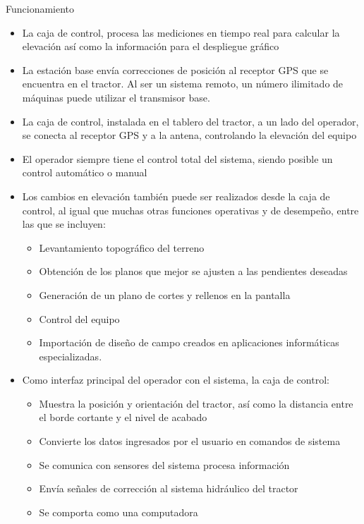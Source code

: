 Funcionamiento
\begin{itemize}
    \item La caja de control, procesa las mediciones en tiempo real para calcular la elevación así como la información para el despliegue gráfico
    \item La estación base envía correcciones de posición al receptor GPS que se encuentra en el tractor. Al ser un sistema remoto, un número ilimitado de máquinas puede utilizar el transmisor base.
    \item La caja de control, instalada en el tablero del tractor, a un lado del operador, se conecta al receptor GPS y a la antena, controlando la elevación del equipo
    \item El operador siempre tiene el control total del sistema, siendo posible un control automático o manual
    \item Los cambios en elevación también puede ser realizados desde la caja de control, al igual que muchas otras funciones operativas y de desempeño, entre las que se incluyen: \begin{itemize}
        \item Levantamiento topográfico del terreno
        \item Obtención de los planos que mejor se ajusten a las pendientes deseadas
        \item Generación de un plano de cortes y rellenos en la pantalla
        \item Control del equipo
        \item Importación de diseño de campo creados en aplicaciones informáticas especializadas.
    \end{itemize}
    \item Como interfaz principal del operador con el sistema, la caja de control: \begin{itemize}
        \item Muestra la posición y orientación del tractor, así como la distancia entre el borde cortante y el nivel de acabado
        \item Convierte los datos ingresados por el usuario en comandos de sistema
        \item Se comunica con sensores del sistema procesa información
        \item Envía señales de corrección al sistema hidráulico del tractor
        \item Se comporta como una computadora
    \end{itemize}
\end{itemize}
